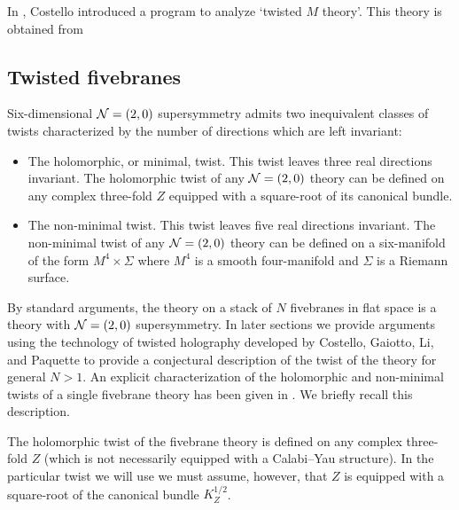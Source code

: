 \documentclass[11pt]{amsart}%
\begin{document}
\parsec[s:twistedsugra]

In \cite{CostelloM5,CostelloM2}, Costello introduced a program to analyze `twisted $M$ theory'. 
This theory is obtained from 

\subsection{Twisted fivebranes} 


Six-dimensional $\mathcal N=(2,0)$ supersymmetry admits two inequivalent classes of twists characterized by the number of directions which are left invariant:
\begin{itemize}
\item 
The holomorphic, or minimal, twist. 
This twist leaves three real directions invariant. 
The holomorphic twist of any $\mathcal N=(2,0)$ theory can be defined on any complex three-fold $Z$ equipped with a square-root of its canonical bundle. 
\item 
The non-minimal twist. 
This twist leaves five real directions invariant.
The non-minimal twist of any $\mathcal N=(2,0)$ theory can be defined on a six-manifold of the form $M^4 \times \Sigma$ where $M^4$ is a smooth four-manifold and $\Sigma$ is a Riemann surface. 
\end{itemize}

By standard arguments, the theory on a stack of $N$ fivebranes in flat space is a theory with $\mathcal N=(2,0)$ supersymmetry. 
In later sections we provide arguments using the technology of twisted holography developed by Costello, Gaiotto, Li, and Paquette \cite{??} to provide a conjectural description of the twist of the theory for general $N > 1$. 
An explicit characterization of the holomorphic and non-minimal twists of a single fivebrane theory has been given in \cite{SWtensor}. 
We briefly recall this description. 

\parsec[s:single]

The holomorphic twist of the fivebrane theory is defined on any complex three-fold $Z$ (which is not necessarily equipped with a Calabi--Yau structure).
In the particular twist we will use we must assume, however, that $Z$ is equipped with a square-root of the canonical bundle $K_Z^{1/2}$. 
\end{document}

